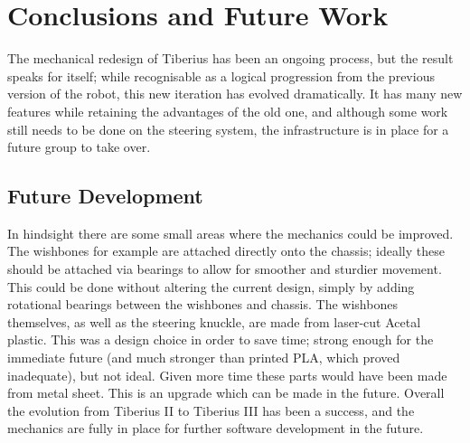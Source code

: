 \section{Conclusions and Future Work}
The mechanical redesign of Tiberius has been an ongoing process, but the result speaks for itself; while recognisable as a logical progression from the previous version of the robot, this new iteration has evolved dramatically. It has many new features while retaining the advantages of the old one, and although some work still needs to be done on the steering system, the infrastructure is in place for a future group to take over.
\newline
\subsection{Future Development}
In hindsight there are some small areas where the mechanics could be improved. The wishbones for example are attached directly onto the chassis; ideally these should be attached via bearings to allow for smoother and sturdier movement. This could be done without altering the current design, simply by adding rotational bearings between the wishbones and chassis.
\newline
The wishbones themselves, as well as the steering knuckle, are made from laser-cut \gls{Acetal} plastic. This was a design choice in order to save time; strong enough for the immediate future (and much stronger than printed PLA, which proved inadequate), but not ideal. Given more time these parts would have been made from metal sheet. This is an upgrade which can be made in the future.
\newline
Overall the evolution from Tiberius II to Tiberius III has been a success, and the mechanics are fully in place for further software development in the future.